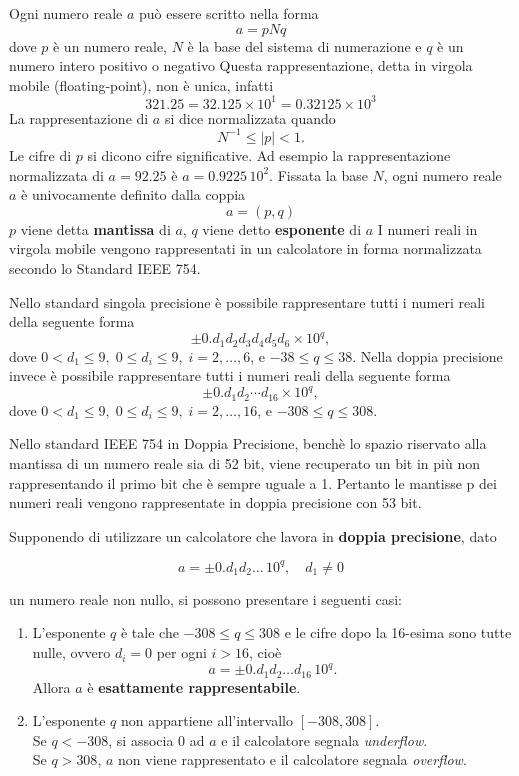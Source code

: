 \documentclass[a4paper,12pt]{article}
\theoremstyle{plain}
\theoremstyle{definition}
\theoremstyle{remark}
\begin{document}
Ogni numero reale $a$ può essere scritto nella forma
\[a = pNq\]
dove $p$ è un numero reale, $N$ è la base del sistema di numerazione e $q$
è un numero intero positivo o negativo
Questa rappresentazione, detta in virgola mobile (floating-point), non
è unica, infatti
\[321.25 = 32.125 \times 10^1 = 0.32125 \times 10^3\]
La rappresentazione di $a$ si dice normalizzata quando
\[N^{-1} \leq |p| < 1.\]
Le cifre di $p$ si dicono cifre significative.
Ad esempio la rappresentazione normalizzata di $a = 92.25$ è
$a = 0.9225\,10^2$.
Fissata la base $N$, ogni numero reale $a$ è univocamente definito dalla
coppia
\[a = (p, q)\]
$p$ viene detta \textbf{mantissa} di $a$, $q$ viene detto \textbf{esponente} di $a$
I numeri reali in virgola mobile vengono rappresentati in un
calcolatore in forma normalizzata secondo lo Standard IEEE 754.

Nello standard singola precisione è possibile rappresentare tutti i numeri reali della seguente forma 
\[\pm0.d_1d_2d_3d_4d_5d_6\times10^q,\]
dove $0<d_1\leq9,\;0\leq d_i\leq9,\;i=2,\ldots,6$, e $-38\leq q\leq 38$.
Nella doppia precisione invece è possibile rappresentare tutti i numeri reali della seguente forma 
\[\pm0.d_1d_2\cdots d_{16}\times10^q,\]
dove $0<d_1\leq9,\;0\leq d_i\leq9,\;i=2,\ldots,16$, e $-308\leq q\leq 308$.

Nello standard IEEE 754 in Doppia Precisione, benchè lo spazio
riservato alla mantissa di un numero reale sia di 52 bit, viene
recuperato un bit in più non rappresentando il primo bit che è sempre
uguale a 1.
Pertanto le mantisse p dei numeri reali vengono rappresentate in
doppia precisione con 53 bit.


Supponendo di utilizzare un calcolatore che lavora in \textbf{doppia precisione}, dato

\[
a = \pm 0.d_1 d_2 \ldots \, 10^q, \quad d_1 \neq 0
\]

un numero reale non nullo, si possono presentare i seguenti casi:

\begin{enumerate}
    \item L’esponente $q$ è tale che $-308 \leq q \leq 308$ e le cifre dopo la 16-esima sono tutte nulle, ovvero $d_i = 0$ per ogni $i > 16$, cioè
    \[
    a = \pm 0.d_1 d_2 \ldots d_{16}\, 10^q.
    \]
    Allora $a$ è \textbf{esattamente rappresentabile}.
    
    \item L’esponente $q$ non appartiene all’intervallo $[-308,308]$. \\
    Se $q < -308$, si associa 0 ad $a$ e il calcolatore segnala \textit{underflow}. \\
    Se $q > 308$, $a$ non viene rappresentato e il calcolatore segnala \textit{overflow}.
\end{enumerate}
\end{document}
